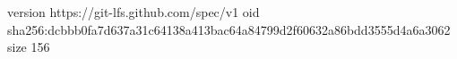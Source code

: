 version https://git-lfs.github.com/spec/v1
oid sha256:dcbbb0fa7d637a31c64138a413bac64a84799d2f60632a86bdd3555d4a6a3062
size 156
